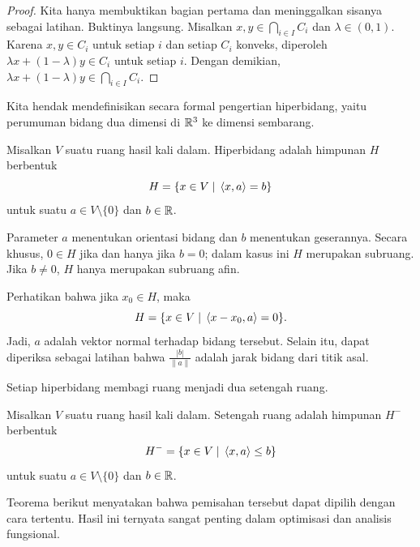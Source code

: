 \begin{proof}
    Kita hanya membuktikan bagian pertama dan meninggalkan sisanya sebagai latihan. Buktinya langsung. Misalkan $x,y\in\bigcap_{i\in I}C_i$ dan $\lambda\in(0,1)$. Karena $x,y\in C_i$ untuk setiap $i$ dan setiap $C_i$ konveks, diperoleh $\lambda x+(1-\lambda)y\in C_i$ untuk setiap $i$. Dengan demikian, $\lambda x+(1-\lambda)y\in\bigcap_{i\in I}C_i$.
\end{proof}

Kita hendak mendefinisikan secara formal pengertian hiperbidang, yaitu perumuman bidang dua dimensi di $\mathbb{R}^3$ ke dimensi sembarang.

\begin{defn}[Hiperbidang]
    Misalkan $V$ suatu ruang hasil kali dalam. Hiperbidang adalah himpunan $H$ berbentuk
    \begin{equation}
        H=\{x\in V\;|\;\left\langle x , a\right\rangle=b\}
    \end{equation}
    untuk suatu $a\in V\setminus\{0\}$ dan $b\in\mathbb{R}$.
\end{defn}

Parameter $a$ menentukan orientasi bidang dan $b$ menentukan geserannya. Secara khusus, $0\in H$ jika dan hanya jika $b=0$; dalam kasus ini $H$ merupakan subruang. Jika $b\neq0$, $H$ hanya merupakan subruang afin.

Perhatikan bahwa jika $x_0\in H$, maka
\begin{equation}
    H=\{x\in V\;|\;\left\langle x-x_0 , a\right\rangle=0\}.
\end{equation}
Jadi, $a$ adalah vektor normal terhadap bidang tersebut. Selain itu, dapat diperiksa sebagai latihan bahwa $\frac{|b|}{\|a\|}$ adalah jarak bidang dari titik asal.

Setiap hiperbidang membagi ruang menjadi dua setengah ruang.
\begin{defn}
    Misalkan $V$ suatu ruang hasil kali dalam. Setengah ruang adalah himpunan $H^-$ berbentuk
    \begin{equation}
        H^-=\{x\in V\;|\;\left\langle x , a\right\rangle\leq b\}
    \end{equation}
    untuk suatu $a\in V\setminus\{0\}$ dan $b\in\mathbb{R}$.
\end{defn}

Teorema berikut menyatakan bahwa pemisahan tersebut dapat dipilih dengan cara tertentu. Hasil ini ternyata sangat penting dalam optimisasi dan analisis fungsional.

